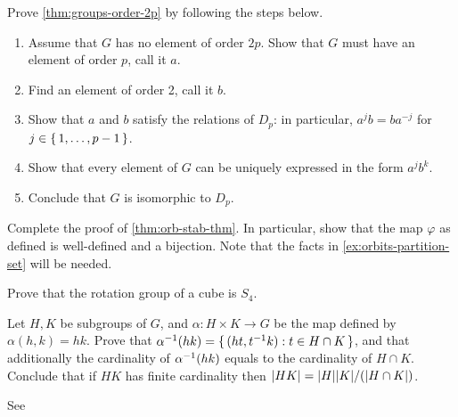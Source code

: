 \documentclass[./main.tex]{subfiles}
\begin{document}
\begin{exercise}
\label{ex:prove-thm-classifying-order-2p}
    Prove \cref{thm:groups-order-2p} by following the steps below.
    \begin{enumerate}
        \item Assume that $G$ has no element of order $2p$. Show that $G$ must have an element of order $p$, call it $a$.
        \item Find an element of order 2, call it $b$.
        \item Show that $a$ and $b$ satisfy the relations of $D_p$: in particular, $a^j b = b a^{-j}$ for $j \in \set{1, \dots, p-1}$.
        \item Show that every element of $G$ can be uniquely expressed in the form $a^jb^k$. 
        \item Conclude that $G$ is isomorphic to $D_p$.
    \end{enumerate}
\end{exercise}

\begin{exercise}
\label{ex:orb-stab-thm}
Complete the proof of \cref{thm:orb-stab-thm}. In particular, show that the map
$\varphi$ as defined is well-defined and a bijection. Note that
the facts in \cref{ex:orbits-partition-set} will be needed.
\end{exercise}

\begin{exercise}
    Prove that the rotation group of a cube is $S_4$.
\end{exercise}

\begin{exercise}
\label{ex:generalization-of-hk-theorem}
    Let $H, K$ be subgroups of $G$, and $\alpha: H \times K \to G$ be the map
    defined by $\alpha(h, k) = hk$. Prove that $\alpha\inv \paren{hk} = \set{(ht, t\inv k): t \in H \cap K}$,
    and that additionally the cardinality of $\alpha\inv\paren{hk}$ equals to the cardinality of $H \cap K$. 
    Conclude that if $HK$ has finite cardinality then $\abs{HK} = \abs H \abs K/(\abs{H \cap K})$.

    See \autocite[Exercise~9,\pno~58]{Jacobson_2009}
\end{exercise}
\end{document}
